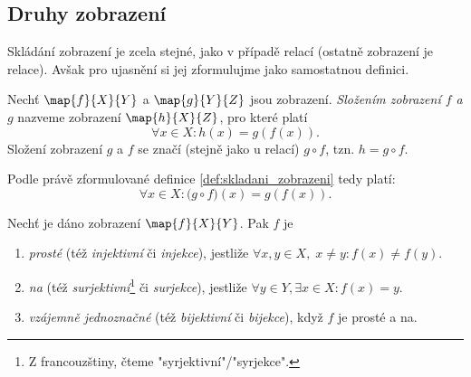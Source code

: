 \subsection{Druhy zobrazení}
Skládání zobrazení je zcela stejné, jako v případě relací (ostatně zobrazení je relace). Avšak pro ujasnění si jej zformulujme jako samostatnou definici.
\begin{definition}\label{def:skladani_zobrazeni}
    Nechť $\map{f}{X}{Y}$ a $\map{g}{Y}{Z}$ jsou zobrazení. \emph{Složením zobrazení $f$ a $g$} nazveme zobrazení $\map{h}{X}{Z}$, pro které platí
    \begin{equation*}
        \forall x\in X: h(x)=g(f(x)).
    \end{equation*}
    Složení zobrazení $g$ a $f$ se značí (stejně jako u relací) $g\circ f$, tzn. $h=g \circ f$.
\end{definition}
Podle právě zformulované definice \ref{def:skladani_zobrazeni} tedy platí:
\begin{equation*}
    \forall x\in X: \bigl(g\circ f\bigr)(x)=g(f(x)).
\end{equation*}
\needspace{1cm}
\begin{definition}\label{def:druhy_zobrazeni}
    Nechť je dáno zobrazení $\map{f}{X}{Y}$. Pak $f$ je
    \begin{enumerate}[label=(\roman*)]
        \item \emph{prosté} (též \emph{injektivní} či \emph{injekce}), jestliže $\forall x,y\in X,\;x\neq y: f(x)\neq f(y)$.
        \item \emph{na} (též \emph{surjektivní}\footnote{Z francouzštiny, čteme "syrjektivní"/"syrjekce".} či \emph{surjekce}), jestliže $\forall y\in Y, \exists x\in X: f(x)=y$.
        \item \emph{vzájemně jednoznačné} (též \emph{bijektivní} či \emph{bijekce}), když $f$ je prosté a na.
    \end{enumerate}
\end{definition}
